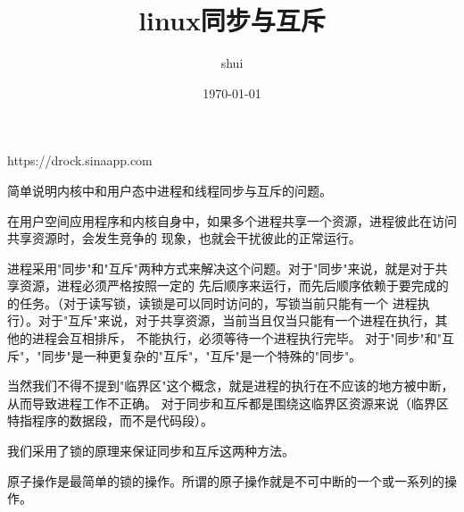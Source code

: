 \documentclass[11pt, a4paper]{article}
\title{linux同步与互斥}
\author{shui}
\date{\today}
\begin{document}
\maketitle
https://drock.sinaapp.com
\clearpage
\par
简单说明内核中和用户态中进程和线程同步与互斥的问题。\allowbreak
\par 
在用户空间应用程序和内核自身中，如果多个进程共享一个资源，进程彼此在访问共享资源时，会发生竞争的\allowbreak
现象，也就会干扰彼此的正常运行。\allowbreak
\par
进程采用"同步"和"互斥"两种方式来解决这个问题。对于"同步"来说，就是对于共享资源，进程必须严格按照一定的
先后顺序来运行，而先后顺序依赖于要完成的的任务。（对于读写锁，读锁是可以同时访问的，写锁当前只能有一个
进程执行）。对于"互斥"来说，对于共享资源，当前当且仅当只能有一个进程在执行，其他的进程会互相排斥，
不能执行，必须等待一个进程执行完毕。
对于"同步"和"互斥"，"同步"是一种更复杂的"互斥"，"互斥"是一个特殊的"同步"。\allowbreak
\par
当然我们不得不提到"临界区"这个概念，就是进程的执行在不应该的地方被中断，从而导致进程工作不正确。
对于同步和互斥都是围绕这临界区资源来说（临界区特指程序的数据段，而不是代码段）。

\par 
我们采用了锁的原理来保证同步和互斥这两种方法。\allowbreak
\par
原子操作是最简单的锁的操作。所谓的原子操作就是不可中断的一个或一系列的操作。 
\end{document}
